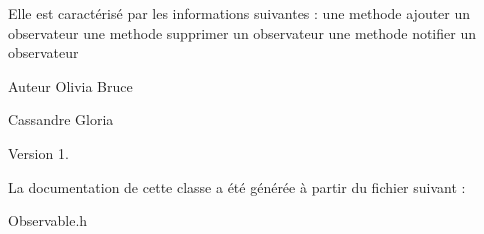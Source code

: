 \-Elle est caractérisé par les informations suivantes \-: une methode ajouter un observateur une methode supprimer un observateur une methode notifier un observateur

\begin{DoxyAuthor}{\-Auteur}
\-Olivia \-Bruce 

\-Cassandre \-Gloria 
\end{DoxyAuthor}
\begin{DoxyVersion}{\-Version}
1. 
\end{DoxyVersion}


\-La documentation de cette classe a été générée à partir du fichier suivant \-:\begin{DoxyCompactItemize}
\item 
\-Observable.\-h\end{DoxyCompactItemize}
